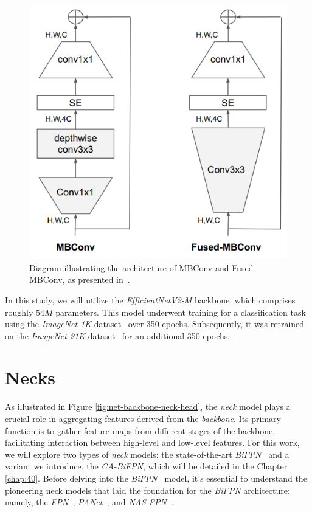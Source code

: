 \begin{figure}[htb]
    \centering
    \includegraphics[width=0.5\linewidth]{figures/chapters-imgs/30/fused-mbconv.png}
    \caption{Diagram illustrating the architecture of MBConv and Fused-MBConv, as presented in~\cite{tan2021efficientnetv2}.}
    \label{fig:fused-mbconv}
\end{figure}

In this study, we will utilize the \textit{EfficientNetV2-M} backbone, which comprises roughly $54M$ parameters. This model underwent training for a classification task using the \textit{ImageNet-1K} dataset~\cite{5206848} over 350 epochs. Subsequently, it was retrained on the \textit{ImageNet-21K} dataset~\cite{5206848} for an additional 350 epochs.

\section{Necks}
As illustrated in Figure \ref{fig:net-backbone-neck-head}, the \textit{neck} model plays a crucial role in aggregating features derived from the \textit{backbone}. Its primary function is to gather feature maps from different stages of the backbone, facilitating interaction between high-level and low-level features.
For this work, we will explore two types of \textit{neck} models: the state-of-the-art \textit{BiFPN}~\cite{DBLP:journals/corr/abs-1911-09070} and a variant we introduce, the \textit{CA-BiFPN}, which will be detailed in the Chapter \ref{chap:40}. Before delving into the \textit{BiFPN}~\cite{DBLP:journals/corr/abs-1911-09070} model, it's essential to understand the pioneering neck models that laid the foundation for the \textit{BiFPN} architecture: namely, the \textit{FPN}~\cite{Lin_2017_CVPR}, \textit{PANet}~\cite{DBLP:journals/corr/abs-1803-01534}, and \textit{NAS-FPN}~\cite{DBLP:journals/corr/abs-1904-07392}.


